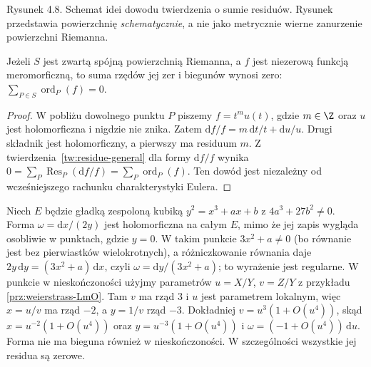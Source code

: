 \begin{center}

{\small Rysunek 4.8. Schemat idei dowodu twierdzenia o sumie residuów.
Rysunek przedstawia powierzchnię \emph{schematycznie}, a nie jako
metrycznie wierne zanurzenie powierzchni Riemanna.}
\end{center}

\begin{wniosek}
Jeżeli $S$ jest zwartą spójną powierzchnią
Riemanna, a $f$ jest niezerową funkcją meromorficzną,
to suma rzędów jej zer i biegunów wynosi zero:
$\sum_{P\in S}\operatorname{ord}_P(f)=0$.
\end{wniosek}
\begin{proof}
W pobliżu dowolnego punktu $P$ piszemy
$f=t^mu(t)$, gdzie $m\in\Z$ oraz $u$ jest
holomorficzna i nigdzie nie znika. Zatem
$\mathrm df/f=m\,\mathrm dt/t+\mathrm du/u$.
Drugi składnik jest holomorficzny, a pierwszy
ma residuum $m$. Z twierdzenia~\ref{tw:residue-general}
dla formy $\mathrm df/f$ wynika
$0=\sum_P\operatorname{Res}_P(\mathrm df/f)
=\sum_P\operatorname{ord}_P(f)$.
Ten dowód jest niezależny od wcześniejszego
rachunku charakterystyki Eulera.
\end{proof}

\begin{przyklad}
Niech $E$ będzie gładką zespoloną kubiką
$y^2=x^3+ax+b$ z $4a^3+27b^2\ne0$.
Forma $\omega=\mathrm dx/(2y)$ jest holomorficzna
na całym $E$, mimo że jej zapis wygląda osobliwie
w punktach, gdzie $y=0$. W takim punkcie
$3x^2+a\ne0$ (bo równanie jest bez pierwiastków
wielokrotnych), a różniczkowanie równania daje
$2y\,\mathrm dy=(3x^2+a)\,\mathrm dx$, czyli
$\omega=\mathrm dy/(3x^2+a)$; to wyrażenie jest
regularne. W punkcie w nieskończoności użyjmy
parametrów $u=X/Y$, $v=Z/Y$ z przykładu
\ref{prz:weierstrass-LmO}. Tam $v$ ma rząd $3$
i $u$ jest parametrem lokalnym, więc
$x=u/v$ ma rząd $-2$, a $y=1/v$ rząd $-3$.
Dokładniej $v=u^3(1+O(u^4))$, skąd
$x=u^{-2}(1+O(u^4))$ oraz
$y=u^{-3}(1+O(u^4))$ i
$\omega=(-1+O(u^4))\,\mathrm du$.
Forma nie ma bieguna również w nieskończoności.
W szczególności wszystkie jej residua są zerowe.
\end{przyklad}

